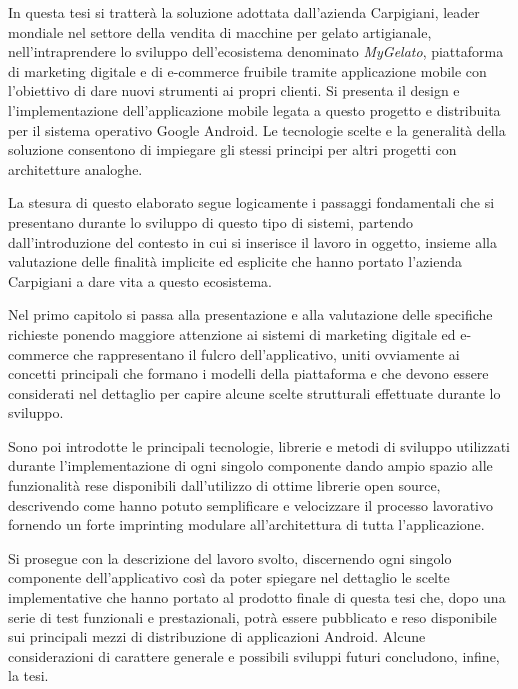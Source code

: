 In questa tesi si tratterà la soluzione adottata dall'azienda Carpigiani,
leader mondiale nel settore della vendita di macchine per gelato artigianale,
nell'intraprendere lo sviluppo dell'ecosistema denominato \emph{MyGelato},
piattaforma di marketing digitale e di e-commerce fruibile tramite
applicazione mobile con l'obiettivo di dare nuovi strumenti ai propri
clienti. Si presenta il design e l’implementazione dell'applicazione
mobile legata a questo progetto e distribuita per il sistema operativo
Google Android. Le tecnologie scelte e la generalità della soluzione
consentono di impiegare gli stessi principi per altri progetti con
architetture analoghe.\medskip{}

La stesura di questo elaborato segue logicamente i passaggi fondamentali
che si presentano durante lo sviluppo di questo tipo di sistemi, partendo
dall'introduzione del contesto in cui si inserisce il lavoro in oggetto,
insieme alla valutazione delle finalità implicite ed esplicite che
hanno portato l'azienda Carpigiani a dare vita a questo ecosistema.

Nel primo capitolo si passa alla presentazione e alla valutazione
delle specifiche richieste ponendo maggiore attenzione ai sistemi
di marketing digitale ed e-commerce che rappresentano il fulcro dell'applicativo,
uniti ovviamente ai concetti principali che formano i modelli della
piattaforma e che devono essere considerati nel dettaglio per capire
alcune scelte strutturali effettuate durante lo sviluppo.

Sono poi introdotte le principali tecnologie, librerie e metodi di
sviluppo utilizzati durante l'implementazione di ogni singolo componente
dando ampio spazio alle funzionalità rese disponibili dall'utilizzo
di ottime librerie open source, descrivendo come hanno potuto semplificare
e velocizzare il processo lavorativo fornendo un forte imprinting
modulare all'architettura di tutta l'applicazione. \medskip{}

Si prosegue con la descrizione del lavoro svolto, discernendo ogni
singolo componente dell'applicativo così da poter spiegare nel dettaglio
le scelte implementative che hanno portato al prodotto finale di questa
tesi che, dopo una serie di test funzionali e prestazionali, potrà
essere pubblicato e reso disponibile sui principali mezzi di distribuzione
di applicazioni Android. Alcune considerazioni di carattere generale
e possibili sviluppi futuri concludono, infine, la tesi.

\newpage{}
